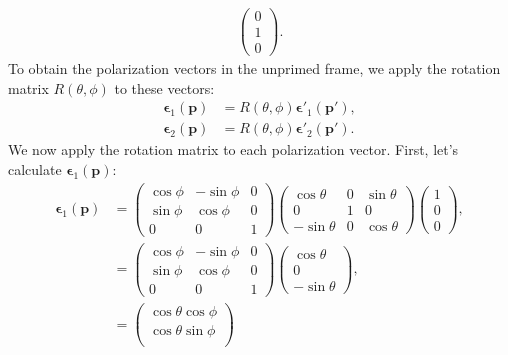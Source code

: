 \begin{enumerate}
\begin{align}
\begin{pmatrix}
        0 \\
        1 \\
        0
    \end{pmatrix}.
\end{align}
To obtain the polarization vectors in the unprimed frame, we apply the rotation matrix \( R(\theta, \phi) \) to these vectors:
\begin{align}
    \boldsymbol{\epsilon}_1(\mathbf{p}) &= R(\theta, \phi) \boldsymbol{\epsilon}'_1(\mathbf{p}'),\\
    \boldsymbol{\epsilon}_2(\mathbf{p}) &= R(\theta, \phi) \boldsymbol{\epsilon}'_2(\mathbf{p}').
\end{align}
We now apply the rotation matrix to each polarization vector. First, let’s calculate \( \boldsymbol{\epsilon}_1(\mathbf{p}) \):
\begin{align*}
    \boldsymbol{\epsilon}_1(\mathbf{p}) &= 
    \begin{pmatrix}
        \cos \phi & -\sin \phi & 0 \\
        \sin \phi & \cos \phi & 0 \\
        0 & 0 & 1
    \end{pmatrix}
    \begin{pmatrix}
        \cos \theta & 0 & \sin \theta \\
        0 & 1 & 0 \\
        -\sin \theta & 0 & \cos \theta
    \end{pmatrix}
    \begin{pmatrix}
        1 \\
        0 \\
        0
    \end{pmatrix}, \nonumber \\
    &= 
    \begin{pmatrix}
        \cos \phi & -\sin \phi & 0 \\
        \sin \phi & \cos \phi & 0 \\
        0 & 0 & 1
    \end{pmatrix}
    \begin{pmatrix}
        \cos \theta \\
        0 \\
        -\sin \theta
    \end{pmatrix}, \nonumber \\
    &= 
    \begin{pmatrix}
        \cos \theta \cos \phi \\
        \cos \theta \sin \phi \\

\end{pmatrix}
\end{align*}
\end{enumerate}
